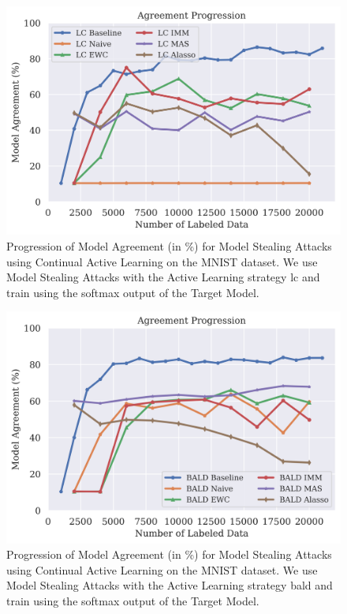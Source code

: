 \begin{figure}[h]
    \centering
    \includegraphics[width=0.7\linewidth]{images/results_CALMS/mnist_softmax_lc.png}
    \caption[Agreement Comparison for Model Stealing on MNIST using the softmax output and the Active Learning strategy LC]{Progression of Model Agreement
    (in \%) for Model Stealing Attacks using Continual Active Learning on the MNIST dataset. We use Model Stealing Attacks with the Active Learning strategy
    \gls{lc} and train using the softmax output of the Target Model.}
    \label{fig:CALMSMNISTSoftmaxLC}
\end{figure}

\begin{figure}[h]
    \centering
    \includegraphics[width=0.7\linewidth]{images/results_CALMS/mnist_softmax_bald.png}
    \caption[Agreement Comparison for Model Stealing on MNIST using the softmax output and the Active Learning strategy BALD]{Progression of Model Agreement
    (in \%) for Model Stealing Attacks using Continual Active Learning on the MNIST dataset. We use Model Stealing Attacks with the Active Learning strategy
    \gls{bald} and train using the softmax output of the Target Model.}
    \label{fig:CALMSMNISTSoftmaxBALD}
\end{figure}

